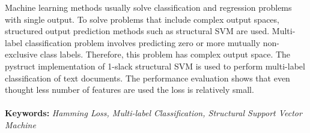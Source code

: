 Machine learning methods usually solve classification and regression problems with single output. To solve problems that include complex output spaces, structured output prediction methods such as structural SVM are used. Multi-label classification problem involves predicting zero or more mutually non-exclusive class labels. Therefore, this problem has complex output space. The pystruct implementation of 1-slack structural SVM is used to perform multi-label classification of text documents. The performance evaluation shows that even thought less number of features are used the loss is relatively small.
\\\\
\textbf{Keywords:} \textit{Hamming Loss, Multi-label Classification, Structural Support Vector Machine}